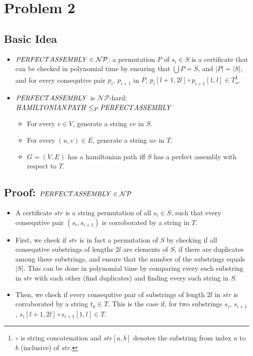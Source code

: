 \documentclass[12pt]{article}
\begin{document}
\section*{Problem 2}
\subsection*{Basic Idea}
\begin{itemize}
	\item $\mathit{PERFECT\-ASSEMBLY} \in \mathcal{NP}$: a permutation $P$ of $s_i \in S$ is a certificate that can be checked in polynomial time by ensuring that $\bigcup P = S$, and $|P| = |S|$, and for every consequtive pair $p_i$, $p_{i+1}$ in $P$, $p_i[l+1, 2l] \circ p_{i+1}[1, l] \in T$\footnote{$\circ$ is string concatenation and $\mathit{str}[a,b]$ denotes the substring from index $a$ to $b$ (inclusive) of $\mathit{str}$.}.
	\item $\mathit{PERFECT\-ASSEMBLY}$ is $\mathcal{NP}$-hard: $\mathit{HAMILTONIAN\-PATH} \leq_P \mathit{PERFECT\-ASSEMBLY}$
	\begin{itemize}
		\item For every $v \in V$, generate a string $vv$ in $S$.
		\item For every $(u,v) \in E$, generate a string $uv$ in $T$.
		\item $G=(V,E)$ has a hamiltonian path iff $S$ has a perfect assembly with respect to $T$.
	\end{itemize}
\end{itemize}

\subsection*{Proof: $\mathit{PERFECT\-ASSEMBLY} \in \mathcal{NP}$}
\begin{itemize}
	\item A certificate $\mathit{str}$ is a string permutation of all $s_i \in S$, such that every consequtive pair $(s_i, s_{i+1})$ is corroborated by a string in $T$.
	\item First, we check if $\mathit{str}$ is in fact a permutation of $S$ by checking if all consequtive substrings of lengths $2l$ are elements of $S$, if there are duplicates among these substrings, and ensure that the number of the substrings equals $|S|$. This can be done in polynomial time by comparing every such substring in $\mathit{str}$ with each other (find duplicates) and finding every such string in $S$.
	\item Then, we check if every consequtive pair of substrings of length $2l$ in $\mathit{str}$ is corraborated by a string $t_k \in T$. This is the case if, for two substrings $s_i$, $s_{i+1}$, $s_i[l+1, 2l] \circ s_{i+1}[1, l] \in T$.
\end{itemize}
\end{document}
